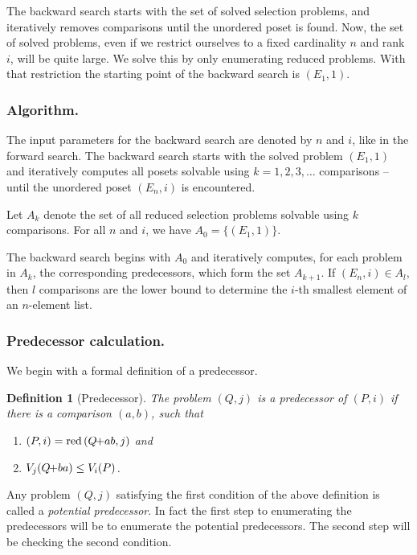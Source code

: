 \documentclass[twoside,leqno,twocolumn]{article}
\newcommand{\pchild}[3]{{#1}\kern-1pt{+}{#2}{#3}}
\newcommand{\reduced}[1]{\operatorname{red}{#1}}
\newtheorem{definition}{Definition}[section]
\begin{document}
The backward search starts with the set of solved selection problems, and iteratively removes comparisons until the unordered poset is found.
Now, the set of solved problems, even if we restrict ourselves to a fixed cardinality $n$ and rank $i$, will be quite large.
We solve this by only enumerating reduced problems.
With that restriction the starting point of the backward search is $(E_1, 1)$.

\subsubsection{Algorithm.} \label{sec:backward:algorithm}
The input parameters for the backward search are denoted by $n$ and $i$, like in the forward search.
The backward search starts with the solved problem $(E_1, 1)$ and iteratively computes all posets solvable using $k = 1, 2, 3, \dots$ comparisons -- until the unordered poset $(E_n, i)$ is encountered.

Let $A_k$ denote the set of all reduced selection problems solvable using $k$ comparisons.
For all $n$ and $i$, we have $A_0 = \{ (E_1, 1) \}$.

The backward search begins with $A_0$ and iteratively computes, for each problem in $A_k$, the corresponding predecessors, which form the set $A_{k + 1}$.
If $(E_n, i) \in A_l$, then $l$ comparisons are the lower bound to determine the $i$-th smallest element of an $n$-element list.

\subsubsection{Predecessor calculation.} \label{sec:backward:predecessor_calculation}
We begin with a formal definition of a predecessor.

\begin{definition}[Predecessor] \label{definition:predecessor_calculation}
  The problem $(Q, j)$ is a \emph{predecessor} of $(P, i)$ if there is a comparison $(a, b)$, such that
  \begin{enumerate}
    \item $(P, i) = \reduced(\pchild{Q}{a}{b}, j)$ and
    \item $V_j(\pchild{Q}{b}{a}) \le V_i(P)$. %
  \end{enumerate}
\end{definition}

Any problem $(Q, j)$ satisfying the first condition of the above definition is called a \emph{potential predecessor}.
In fact the first step to enumerating the predecessors will be to enumerate the potential predecessors.
The second step will be checking the second condition.
\end{document}
